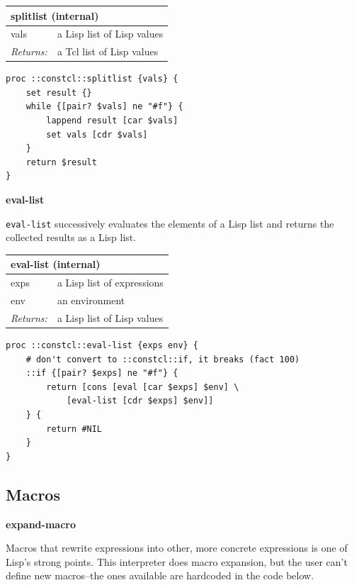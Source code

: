 \documentclass[twoside,9pt]{report}
\begin{document}
\begin{tabular}{ |l l| }
\hline
\multicolumn{2}{|l|}{splitlist (internal)} \\
\hline
vals & a Lisp list of Lisp values \\
\textit{Returns:} & a Tcl list of Lisp values \\
\hline
\end{tabular}

\noindent\makebox[\linewidth]{\rule{\linewidth}{0.4pt}}
\begin{lstlisting}
proc ::constcl::splitlist {vals} {
    set result {}
    while {[pair? $vals] ne "#f"} {
        lappend result [car $vals]
        set vals [cdr $vals]
    }
    return $result
}
\end{lstlisting}
\noindent\makebox[\linewidth]{\rule{\linewidth}{0.4pt}}

\textbf{eval-list}


\texttt{eval-list} successively evaluates the elements of a Lisp list and returns the collected results as a Lisp list.

\begin{tabular}{ |l l| }
\hline
\multicolumn{2}{|l|}{eval-list (internal)} \\
\hline
exps & a Lisp list of expressions \\
env & an environment \\
\textit{Returns:} & a Lisp list of Lisp values \\
\hline
\end{tabular}

\noindent\makebox[\linewidth]{\rule{\linewidth}{0.4pt}}
\begin{lstlisting}
proc ::constcl::eval-list {exps env} {
    # don't convert to ::constcl::if, it breaks (fact 100)
    ::if {[pair? $exps] ne "#f"} {
        return [cons [eval [car $exps] $env] \
            [eval-list [cdr $exps] $env]]
    } {
        return #NIL
    }
}
\end{lstlisting}
\noindent\makebox[\linewidth]{\rule{\linewidth}{0.4pt}}
\subsection{Macros}
\label{macros}

\textbf{expand-macro}


Macros that rewrite expressions into other, more concrete expressions is one of Lisp's strong points. This interpreter does macro expansion, but the user can't define new macros--the ones available are hardcoded in the code below.
\end{document}
